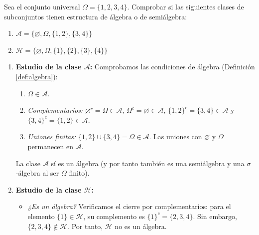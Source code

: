 \begin{problema}
Sea el conjunto universal $\Omega = \{1, 2, 3, 4\}$. Comprobar si las siguientes clases de subconjuntos tienen estructura de álgebra o de semiálgebra:
\begin{enumerate}[label=\alph*)]
    \item $\mathcal{A} = \{ \varnothing, \Omega, \{1,2\}, \{3,4\} \}$
    \item $\mathcal{H} = \{ \varnothing, \Omega, \{1\}, \{2\}, \{3\}, \{4\} \}$
\end{enumerate}

\tcblower

\begin{enumerate}[label=\alph*)]
    \item \textbf{Estudio de la clase $\mathcal{A}$:}
    Comprobamos las condiciones de álgebra (Definición \ref{def:algebra}):
    \begin{enumerate}
        \item $\Omega \in \mathcal{A}$.
        \item \textit{Complementarios:} $\varnothing^c = \Omega \in \mathcal{A}$, $\Omega^c = \varnothing \in \mathcal{A}$, $\{1,2\}^c = \{3,4\} \in \mathcal{A}$ y $\{3,4\}^c = \{1,2\} \in \mathcal{A}$.
        \item \textit{Uniones finitas:} $\{1,2\} \cup \{3,4\} = \Omega \in \mathcal{A}$. Las uniones con $\varnothing$ y $\Omega$ permanecen en $\mathcal{A}$.
    \end{enumerate}
    La clase $\mathcal{A}$ sí es un álgebra (y por tanto también es una semiálgebra y una $\sigma$-álgebra al ser $\Omega$ finito).

    \item \textbf{Estudio de la clase $\mathcal{H}$:}
    \begin{itemize}
        \item \textit{¿Es un álgebra?}
        Verificamos el cierre por complementarios: para el elemento $\{1\} \in \mathcal{H}$, su complemento es $\{1\}^c = \{2,3,4\}$. Sin embargo, $\{2,3,4\} \notin \mathcal{H}$. Por tanto, $\mathcal{H}$ no es un álgebra.


\end{itemize}
\end{enumerate}
\end{problema}
